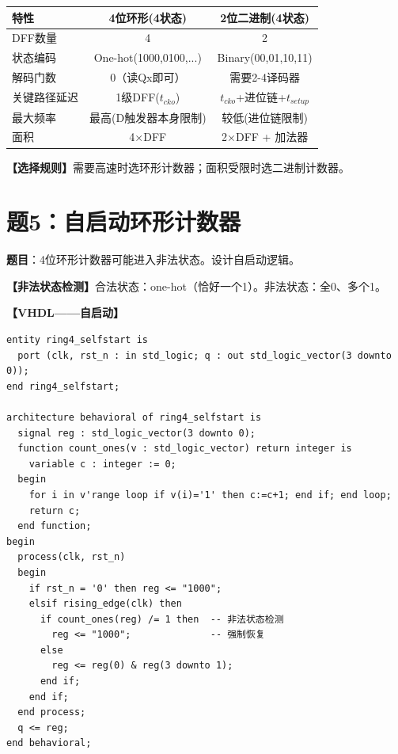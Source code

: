 \begin{solution}[完整解答]

\begin{center}
\begin{tabular}{|l|c|c|}\hline
\textbf{特性} & \textbf{4位环形(4状态)} & \textbf{2位二进制(4状态)} \\ \hline
DFF数量 & 4 & 2 \\
状态编码 & One-hot(1000,0100,...) & Binary(00,01,10,11) \\
解码门数 & 0（读Qx即可）& 需要2-4译码器 \\
关键路径延迟 & 1级DFF($t_{cko}$) & $t_{cko}$+进位链+$t_{setup}$ \\
最大频率 & 最高(D触发器本身限制) & 较低(进位链限制) \\
面积 & 4×DFF & 2×DFF + 加法器 \\
\hline
\end{tabular}
\end{center}

\textbf{【选择规则】}需要高速时选环形计数器；面积受限时选二进制计数器。

\end{solution}


\section{题5：自启动环形计数器}

\textbf{题目}：4位环形计数器可能进入非法状态。设计自启动逻辑。

\begin{solution}[完整解答]

\textbf{【非法状态检测】}合法状态：one-hot（恰好一个1）。非法状态：全0、多个1。

\textbf{【VHDL——自启动】}
\begin{lstlisting}
entity ring4_selfstart is
  port (clk, rst_n : in std_logic; q : out std_logic_vector(3 downto 0));
end ring4_selfstart;

architecture behavioral of ring4_selfstart is
  signal reg : std_logic_vector(3 downto 0);
  function count_ones(v : std_logic_vector) return integer is
    variable c : integer := 0;
  begin
    for i in v'range loop if v(i)='1' then c:=c+1; end if; end loop;
    return c;
  end function;
begin
  process(clk, rst_n)
  begin
    if rst_n = '0' then reg <= "1000";
    elsif rising_edge(clk) then
      if count_ones(reg) /= 1 then  -- 非法状态检测
        reg <= "1000";              -- 强制恢复
      else
        reg <= reg(0) & reg(3 downto 1);
      end if;
    end if;
  end process;
  q <= reg;
end behavioral;
\end{lstlisting}

\end{solution}


